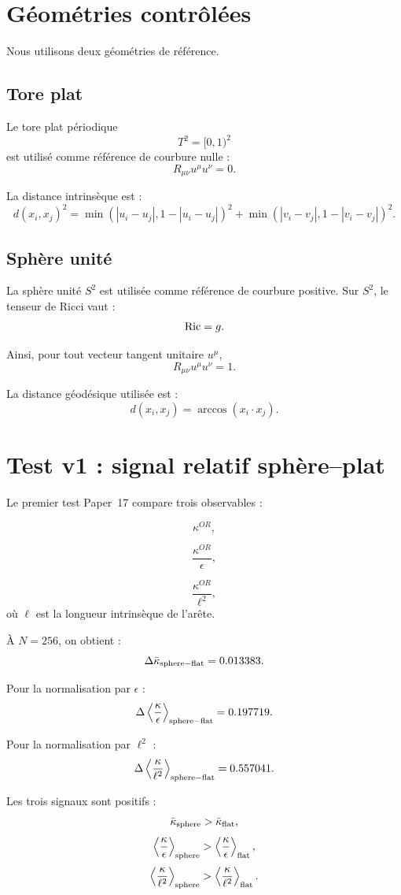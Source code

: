 \documentclass[11pt,a4paper]{article}
\begin{document}
\section{Géométries contrôlées}

Nous utilisons deux géométries de référence.

\subsection{Tore plat}

Le tore plat périodique
\[
T^2=[0,1)^2
\]
est utilisé comme référence de courbure nulle :
\[
R_{\mu\nu}u^\mu u^\nu=0.
\]

La distance intrinsèque est :
\[
d(x_i,x_j)^2
=
\min(|u_i-u_j|,1-|u_i-u_j|)^2
+
\min(|v_i-v_j|,1-|v_i-v_j|)^2.
\]

\subsection{Sphère unité}

La sphère unité \(S^2\) est utilisée comme référence de courbure positive.
Sur \(S^2\), le tenseur de Ricci vaut :
\[
{\rm Ric}=g.
\]

Ainsi, pour tout vecteur tangent unitaire \(u^\mu\),
\[
R_{\mu\nu}u^\mu u^\nu=1.
\]

La distance géodésique utilisée est :
\[
d(x_i,x_j)
=
\arccos(x_i\cdot x_j).
\]

\section{Test v1 : signal relatif sphère--plat}

Le premier test Paper~17 compare trois observables :

\[
\kappa^{OR},
\]

\[
\frac{\kappa^{OR}}{\epsilon},
\]

\[
\frac{\kappa^{OR}}{\ell^2},
\]
où \(\ell\) est la longueur intrinsèque de l'arête.

À \(N=256\), on obtient :
\[
\Delta\bar\kappa_{\rm sphere-flat}
=
0.013383.
\]

Pour la normalisation par \(\epsilon\) :
\[
\Delta
\left\langle
\frac{\kappa}{\epsilon}
\right\rangle_{\rm sphere-flat}
=
0.197719.
\]

Pour la normalisation par \(\ell^2\) :
\[
\Delta
\left\langle
\frac{\kappa}{\ell^2}
\right\rangle_{\rm sphere-flat}
=
0.557041.
\]

Les trois signaux sont positifs :
\[
\bar\kappa_{\rm sphere}
>
\bar\kappa_{\rm flat},
\]
\[
\left\langle\frac{\kappa}{\epsilon}\right\rangle_{\rm sphere}
>
\left\langle\frac{\kappa}{\epsilon}\right\rangle_{\rm flat},
\]
\[
\left\langle\frac{\kappa}{\ell^2}\right\rangle_{\rm sphere}
>
\left\langle\frac{\kappa}{\ell^2}\right\rangle_{\rm flat}.
\]
\end{document}
